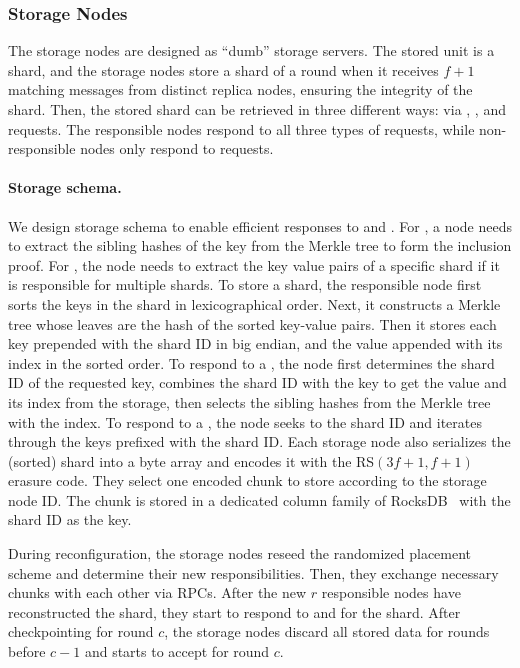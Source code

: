 \subsubsection{Storage Nodes}

The storage nodes are designed as ``dumb'' storage servers.
The stored unit is a shard, and the storage nodes store a shard of a round when it receives $f+1$ matching \pushss messages from distinct replica nodes, ensuring the integrity of the shard.
Then, the stored shard can be retrieved in three different ways: via \retrieve, \retrieves, and \getsc requests.
The responsible nodes respond to all three types of requests, while non-responsible nodes only respond to \getsc requests.

\paragraph{Storage schema.}
We design storage schema to enable efficient responses to \retrieve and \retrieves.
For \retrieve, a node needs to extract the sibling hashes of the key from the Merkle tree to form the inclusion proof.
For \retrieves, the node needs to extract the key value pairs of a specific shard if it is responsible for multiple shards.
To store a shard, the responsible node first sorts the keys in the shard in lexicographical order.
Next, it constructs a Merkle tree whose leaves are the hash of the sorted key-value pairs.
Then it stores each key prepended with the shard ID in big endian, and the value appended with its index in the sorted order.
To respond to a \retrieve, the node first determines the shard ID of the requested key, combines the shard ID with the key to get the value and its index from the storage, then selects the sibling hashes from the Merkle tree with the index.
To respond to a \retrieves, the node seeks to the shard ID and iterates through the keys prefixed with the shard ID.
Each storage node also serializes the (sorted) shard into a byte array and encodes it with the RS$(3f+1, f+1)$ erasure code.
They select one encoded chunk to store according to the storage node ID.
The chunk is stored in a dedicated column family of RocksDB~\cite{rocksdb} with the shard ID as the key.

During reconfiguration, the storage nodes reseed the randomized placement scheme and determine their new responsibilities.
Then, they exchange necessary chunks with each other via \getsc RPCs.
After the new $r$ responsible nodes have reconstructed the shard, they start to respond to \retrieve and \retrieves for the shard.
After checkpointing for round $c$, the storage nodes discard all stored data for rounds before $c-1$ and starts to accept \pushss for round $c$.

